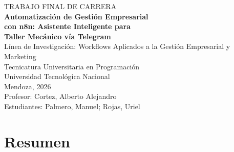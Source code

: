 \documentclass[12pt,a4paper]{report}
\begin{document}
\begin{titlepage}
\centering
\vspace*{2cm}
{\Large TRABAJO FINAL DE CARRERA}\\[1.5cm]
{\LARGE\bfseries Automatización de Gestión Empresarial\\ con n8n: Asistente Inteligente para\\ Taller Mecánico vía Telegram}\\[1cm]
{\large Línea de Investigación: Workflows Aplicados a la Gestión Empresarial y Marketing}\\[1.5cm]
{\large Tecnicatura Universitaria en Programación}\\[0.5cm]
{\large Universidad Tecnológica Nacional}\\[0.5cm]
{\large Mendoza, 2026}\\[1cm]
{\large Profesor: Cortez, Alberto Alejandro}\\[0.5cm]
{\large Estudiantes: Palmero, Manuel; Rojas, Uriel}\\[0.5cm]
\end{titlepage}

\tableofcontents
\newpage

\chapter*{Resumen}
\end{document}
